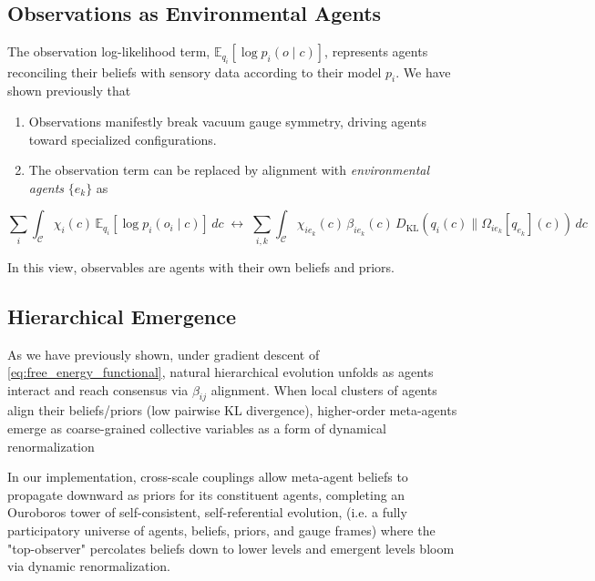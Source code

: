 \documentclass[11pt]{article}
\begin{document}
\subsection{Observations as Environmental Agents}

The observation log-likelihood term, $\mathbb{E}_{q_i}[\log p_i(o \mid c)]$, represents agents reconciling their beliefs with sensory data according to their model $p_i$. We have shown previously that \cite{Dennis2025, Dennis2025a, Dennis2025b}

\begin{enumerate}
    \item Observations manifestly break vacuum gauge symmetry, driving agents toward specialized configurations.
    \item The observation term can be replaced by alignment with \emph{environmental agents} $\{e_k\}$ as
\end{enumerate}

\begin{equation}
\sum_i \int_{\mathcal{C}} \chi_i(c) \, \mathbb{E}_{q_i}[\log p_i(o_i \mid c)] \, dc \;\longleftrightarrow\; \sum_{i,k} \int_{\mathcal{C}} \chi_{ie_k}(c) \, \beta_{ie_k}(c) \, D_{\mathrm{KL}}(q_i(c) \| \Omega_{ie_k}[q_{e_k}](c)) \, dc
\label{eq:obs_as_agents}
\end{equation}

In this view, observables are agents with their own beliefs and priors.

\subsection{Hierarchical Emergence}

As we have previously shown, under gradient descent of \eqref{eq:free_energy_functional}, natural hierarchical evolution unfolds as agents interact and reach consensus via $\beta_{ij}$ alignment. When local clusters of agents align their beliefs/priors (low pairwise KL divergence), higher-order meta-agents emerge as coarse-grained collective variables as a form of dynamical renormalization ~\cite{Dennis2025a}

In our implementation, cross-scale couplings allow meta-agent beliefs to propagate downward as priors for its constituent agents, completing an Ouroboros tower of self-consistent, self-referential evolution, (i.e. a fully participatory universe of agents, beliefs, priors, and gauge frames) where the "top-observer" percolates beliefs down to lower levels and emergent levels bloom via dynamic renormalization.
\end{document}
